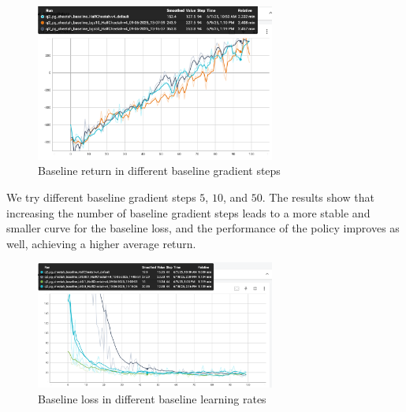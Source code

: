 \documentclass{article}
\begin{document}
\begin{figure}[H]
    \centering
    \includegraphics[width=0.7\textwidth]{img/HalfCheet_baseline_bgs_return.png}
    \caption{Baseline return in different baseline gradient steps}
    \label{fig:baseline_return_bgs}
\end{figure}

We try different baseline gradient steps $5$, $10$, and $50$.
The results show that increasing the number of baseline gradient steps leads to a more stable and smaller curve for the baseline loss,
and the performance of the policy improves as well, achieving a higher average return.

\begin{figure}[H]
    \centering
    \includegraphics[width=0.7\textwidth]{img/HalfCheet_baseline_blr_loss.png}
    \caption{Baseline loss in different baseline learning rates}
    \label{fig:baseline_loss_blr}
\end{figure}
\end{document}
